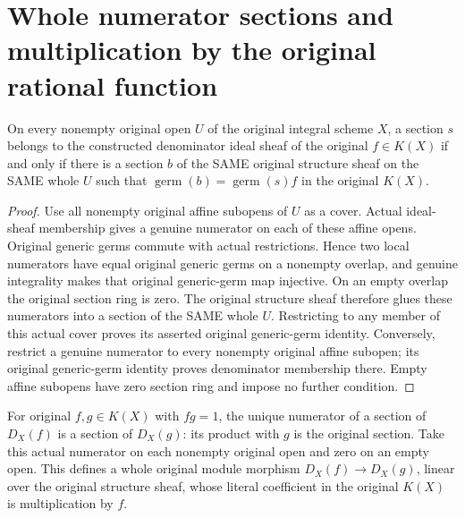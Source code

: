 \section{Whole numerator sections and multiplication by the original rational function}

\begin{theorem}
\label{thm:fc-scheme-denominator-numerator-sections}
\leanok
{}
On every nonempty original open $U$ of the original integral scheme $X$,
a section $s$ belongs to the constructed denominator ideal sheaf of the
original $f\in K(X)$ if and only if there is a section $b$ of the SAME
original structure sheaf on the SAME whole $U$ such that
$\operatorname{germ}(b)=\operatorname{germ}(s)f$ in the original $K(X)$.
\end{theorem}
\begin{proof}
Use all nonempty original affine subopens of $U$ as a cover. Actual
ideal-sheaf membership gives a genuine numerator on each of these affine
opens. Original generic germs commute with actual restrictions. Hence
two local numerators have equal original generic germs on a nonempty
overlap, and genuine integrality makes that original generic-germ map
injective. On an empty overlap the original section ring is zero.
The original structure sheaf therefore glues these numerators into a
section of the SAME whole $U$. Restricting to any member of this actual
cover proves its asserted original generic-germ identity. Conversely,
restrict a genuine numerator to every nonempty original affine subopen;
its original generic-germ identity proves denominator membership there.
Empty affine subopens have zero section ring and impose no further
condition.
\end{proof}

\begin{definition}
\label{def:fc-scheme-denominator-multiplication}
\leanok
{}
For original $f,g\in K(X)$ with $fg=1$, the unique numerator of a section
of $D_X(f)$ is a section of $D_X(g)$: its product with $g$ is the original
section. Take this actual numerator on each nonempty original open and
zero on an empty open. This defines a whole original module morphism
$D_X(f)\to D_X(g)$, linear over the original structure sheaf, whose
literal coefficient in the original $K(X)$ is multiplication by $f$.
\end{definition}

